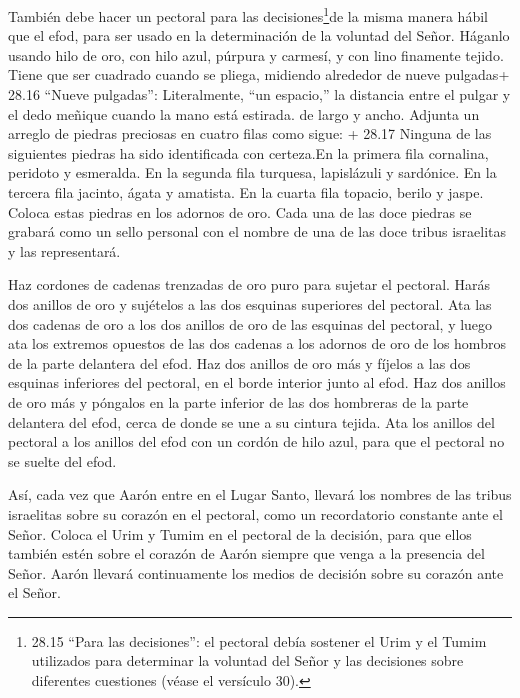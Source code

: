  También debe hacer un pectoral para las
decisiones\footnote{28.15 ``Para las decisiones'': el pectoral debía
  sostener el Urim y el Tumim utilizados para determinar la voluntad del
  Señor y las decisiones sobre diferentes cuestiones (véase el versículo
  30).}de la misma manera hábil que el efod, para ser usado en la
determinación de la voluntad del Señor. Háganlo usando hilo de oro, con
hilo azul, púrpura y carmesí, y con lino finamente tejido. 
Tiene que ser cuadrado cuando se pliega, midiendo alrededor de nueve
pulgadas+ 28.16 ``Nueve pulgadas'': Literalmente, ``un espacio,'' la
distancia entre el pulgar y el dedo meñique cuando la mano está
estirada. de largo y ancho.  Adjunta un arreglo de piedras
preciosas en cuatro filas como sigue: + 28.17 Ninguna de las siguientes
piedras ha sido identificada con certeza.En la primera fila cornalina,
peridoto y esmeralda.  En la segunda fila turquesa,
lapislázuli y sardónice.  En la tercera fila jacinto, ágata
y amatista.  En la cuarta fila topacio, berilo y jaspe.
Coloca estas piedras en los adornos de oro.  Cada una de
las doce piedras se grabará como un sello personal con el nombre de una
de las doce tribus israelitas y las representará.

 Haz cordones de cadenas trenzadas de oro puro para sujetar
el pectoral.  Harás dos anillos de oro y sujételos a las
dos esquinas superiores del pectoral.  Ata las dos cadenas
de oro a los dos anillos de oro de las esquinas del pectoral,
 y luego ata los extremos opuestos de las dos cadenas a los
adornos de oro de los hombros de la parte delantera del efod.
 Haz dos anillos de oro más y fíjelos a las dos esquinas
inferiores del pectoral, en el borde interior junto al efod.
 Haz dos anillos de oro más y póngalos en la parte inferior
de las dos hombreras de la parte delantera del efod, cerca de donde se
une a su cintura tejida.  Ata los anillos del pectoral a
los anillos del efod con un cordón de hilo azul, para que el pectoral no
se suelte del efod.

 Así, cada vez que Aarón entre en el Lugar Santo, llevará
los nombres de las tribus israelitas sobre su corazón en el pectoral,
como un recordatorio constante ante el Señor.  Coloca el
Urim y Tumim en el pectoral de la decisión, para que ellos también estén
sobre el corazón de Aarón siempre que venga a la presencia del Señor.
Aarón llevará continuamente los medios de decisión sobre su corazón ante
el Señor.

